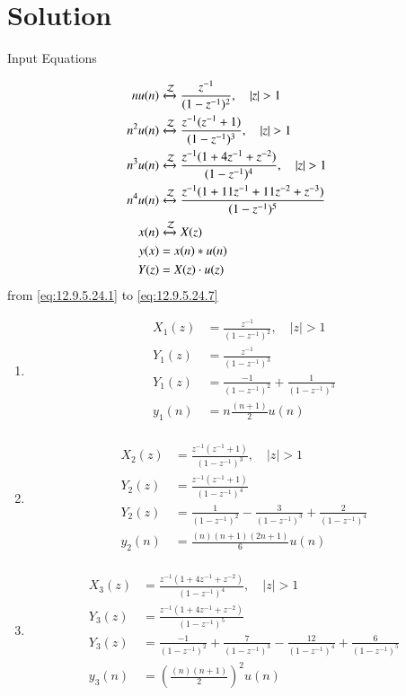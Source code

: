 \documentclass[journal,12pt,onecolumn]{IEEEtran}
\theoremstyle{remark}
\begin{document}
\section*{Solution}
\begin{table}[h]
  \centering
  
  \caption{Input Equations}
  \label{tab:input-equations}
\end{table}
\begin{align}
    n u(n) & \xleftrightarrow{\mathcal{Z}} \frac{z^{-1}}{(1-z^{-1})^2},  \quad \abs{z} > 1 &\label{eq:12.9.5.24.1} \\
    n^2 u(n) & \xleftrightarrow{\mathcal{Z}} \frac{z^{-1}(z^{-1}+1)}{(1-z^{-1})^3},  \quad \abs{z} > 1 &\label{eq:12.9.5.24.2} \\
    n^3 u(n) & \xleftrightarrow{\mathcal{Z}} \frac{z^{-1}(1+4z^{-1}+z^{-2})}{(1-z^{-1})^4},  \quad \abs{z} >1  &\label{eq:12.9.5.24.3} \\
    n^4 u(n) & \xleftrightarrow{\mathcal{Z}} \frac{z^{-1}(1+11z^{-1}+11z^{-2}+z^{-3})}{(1-z^{-1})^5} &\label{eq:12.9.5.24.4} \\
    x(n) & \xleftrightarrow{\mathcal{Z}} X(z) \label{eq:12.9.5.24.5} \\
    y(x) &= x(n)* u(n) \label{eq:12.9.5.24.6} \\
    Y(z) &= X(z) \cdot u(z)  \label{eq:12.9.5.24.7} 
\end{align}
from \eqref{eq:12.9.5.24.1} to \eqref{eq:12.9.5.24.7}  \\
    \begin{enumerate}
    \item 
    \begin{align}
    X_1(z) &= \frac{z^{-1}}{(1-z^{-1})^2},  \quad |z| > 1 \\
    Y_1(z) &= \frac{z^{-1}}{(1-z^{-1})^3} \\
    Y_1(z) &= \frac{-1}{(1-z^{-1})^2}+\frac{1}{(1-z^{-1})^3} \\
    y_1(n) &= n\frac{(n+1)}{2}u(n)\\
    \end{align}
    \item
    \begin{align} 
    X_2(z) &= \frac{z^{-1}(z^{-1}+1)}{(1-z^{-1})^3},  \quad |z| > 1 \\
    Y_2(z) &= \frac{z^{-1}(z^{-1}+1)}{(1-z^{-1})^4} \\ 
    Y_2(z) &= \frac{1}{(1-z^{-1})^2}-\frac{3}{(1-z^{-1})^3}+\frac{2}{(1-z^{-1})^4} \\
    y_2(n) &= \frac{(n)(n+1)(2n+1)}{6}u(n) \\
    \end{align}
    \item 
    \begin{align}
    X_3(z) &= \frac{z^{-1}(1+4z^{-1}+z^{-2})}{(1-z^{-1})^4},  \quad |z| > 1 \\
    Y_3(z) &= \frac{z^{-1}(1+4z^{-1}+z^{-2})}{(1-z^{-1})^5}\\
    Y_3(z) &= \frac{-1}{(1-z^{-1})^2}+\frac{7}{(1-z^{-1})^3}-\frac{12}{(1-z^{-1})^4}+\frac{6}{(1-z^{-1})^5}\\
    y_3(n) &= \left(\frac{(n)(n+1)}{2}\right)^2u(n)
    \end{align}
    \end{enumerate}
\end{document}
